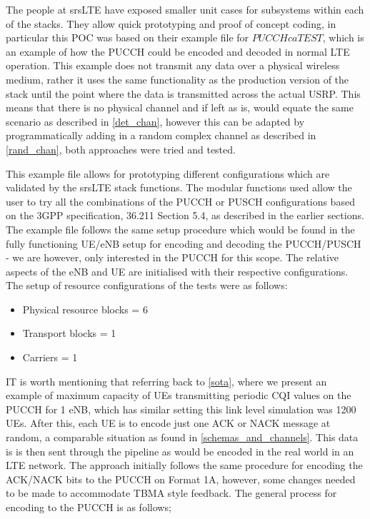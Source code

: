 \documentclass{article}
\begin{document}
The people at srsLTE have exposed smaller unit cases for subsystems within each of the stacks. They allow quick prototyping and proof of concept coding, in particular this POC was based on their example file for $PUCCH ca TEST$, which is an example of how the PUCCH could be encoded and decoded in normal LTE operation. This example does not transmit any data over a physical wireless medium, rather it uses the same functionality as the production version of the stack until the point where the data is transmitted across the actual USRP. This means that there is no physical channel and if left as is, would equate the same scenario as described in \cref{det_chan}, however this can be adapted by programmatically adding in a random complex channel as described in \cref{rand_chan}, both approaches were tried and tested. 

This example file allows for prototyping different configurations which are validated by the srsLTE stack functions. The modular functions used allow the user to try all the combinations of the PUCCH or PUSCH configurations based on the 3GPP specification, 36.211 Section 5.4, as described in the earlier sections. The example file follows the same setup procedure which would be found in the fully functioning UE/eNB setup for encoding and decoding the PUCCH/PUSCH - we are however, only interested in the PUCCH for this scope. The relative aspects of the eNB and UE are initialised with their respective configurations. The setup of resource configurations of the tests were as follows:

\begin{itemize}
    \item Physical resource blocks = 6
    \item Transport blocks = 1
    \item Carriers = 1
\end{itemize}


IT is worth mentioning that referring back to \cref{sota}, where we present an example of maximum capacity of UEs transmitting periodic CQI values on the \ac{PUCCH} for 1 \ac{eNB}, which has similar setting this link level simulation was 1200 UEs. 
After this, each UE is to encode just one ACK or NACK message at random, a comparable situation as found in \cref{schemas_and_channels}. This data is is then sent through the pipeline as would be encoded in the real world in an LTE network. The approach initially follows the same procedure for encoding the ACK/NACK bits to the PUCCH on Format 1A, however, some changes needed to be made to accommodate TBMA style feedback. The general process for encoding to the PUCCH is as follows;
\end{document}
